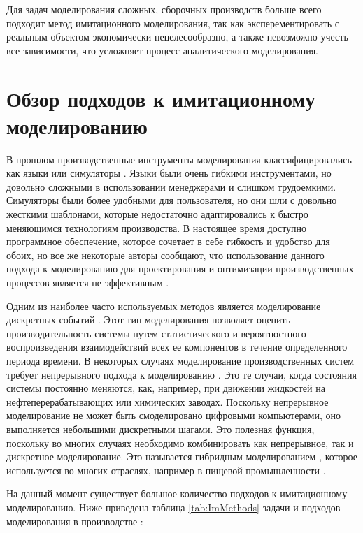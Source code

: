 Для задач моделирования сложных, сборочных производств больше всего подходит метод имитационного моделирования, так как эксперементировать с реальным объектом экономически нецелесообразно, а также невозможно учесть все зависимости, что усложняет процесс аналитического моделирования.

\section{Обзор подходов к имитационному моделированию}

В прошлом производственные инструменты моделирования классифицировались как языки или симуляторы \cite{Velazco}. Языки были очень гибкими инструментами, но довольно сложными в использовании менеджерами и слишком трудоемкими. Симуляторы были более удобными для пользователя, но они шли с довольно жесткими шаблонами, которые недостаточно адаптировались к быстро меняющимся технологиям производства. В настоящее время доступно программное обеспечение, которое сочетает в себе гибкость и удобство для обоих, но все же некоторые авторы сообщают, что использование данного подхода к моделированию для проектирования и оптимизации производственных процессов является не эффективным \cite{Benedettini} \cite{Holst}.

Одним из наиболее часто используемых методов является моделирование дискретных событий \cite{Detty}. Этот тип моделирования позволяет оценить производительность системы путем статистического и вероятностного воспроизведения взаимодействий всех ее компонентов в течение определенного периода времени. В некоторых случаях моделирование производственных систем требует непрерывного подхода к моделированию \cite{Robinson}. Это те случаи, когда состояния системы постоянно меняются, как, например, при движении жидкостей на нефтеперерабатывающих или химических заводах. Поскольку непрерывное моделирование не может быть смоделировано цифровыми компьютерами, оно выполняется небольшими дискретными шагами. Это полезная функция, поскольку во многих случаях необходимо комбинировать как непрерывное, так и дискретное моделирование. Это называется гибридным моделированием \cite{inproceedings}, которое используется во многих отраслях, например в пищевой промышленности \cite{Benedettini}.

На данный момент существует большое количество подходов к имитационному моделированию. Ниже приведена таблица \ref{tab:ImMethods} задачи и подходов моделирования в производстве \cite{Jahangirian}:

